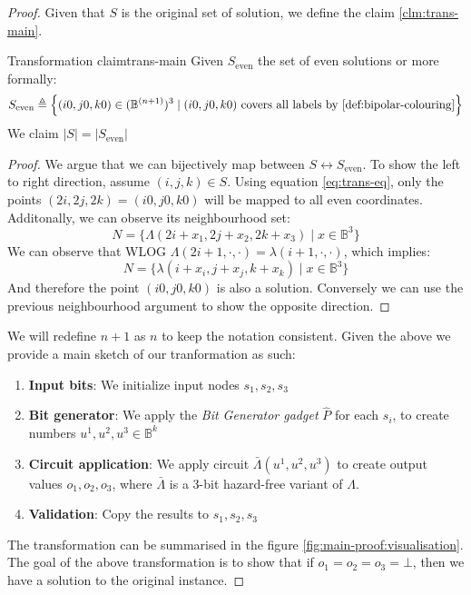 \begin{proof}
Given that $S$ is the original set of solution, we define the claim \ref{clm:trans-main}.

\begin{claimbox}{Transformation claim}{trans-main}
    \label{clm:main-proof:trans-claim}
    Given $S_{\text{even}}$ the set of even solutions or more formally:
    $$
        S_{\text{even}} \triangleq
        \Big\{(i0,j0,k0) \in (\mathbb{B}^{(n+1)})^3 \mid (i0,j0,k0) \text{ covers all labels by \ref{def:bipolar-colouring}} \Big\}
    $$
    We claim $|S| = |S_{\text{even}}|$
\end{claimbox}

\begin{proof}
    We argue that we can bijectively map between $S \leftrightarrow S_{\text{even}}$.
    To show the left to right direction, assume $(i,j,k) \in S$.
    Using equation \ref{eq:trans-eq}, only the points $(2i, 2j, 2k) = (i0, j0,k0)$ will be mapped to all even coordinates.
    Additonally, we can observe its neighbourhood set:
    $$
    N = \Big\{\Lambda(2i + x_1, 2j + x_2, 2k + x_3) \mid x \in \mathbb{B}^3 \Big\}
    $$
    We can observe that WLOG $\Lambda(2i + 1, \cdot, \cdot) = \lambda(i + 1, \cdot, \cdot)$, which implies:
    $$
    N = \Big\{\lambda(i + x_i, j + x_j, k + x_k) \mid x \in \mathbb{B}^3 \Big\}
    $$
    And therefore the point $(i0, j0,k0)$ is also a solution. Conversely we can use the previous neighbourhood argument to show the opposite
    direction.
\end{proof}
We will redefine $n + 1$ as $n$ to keep the notation consistent.
Given the above we provide a main sketch of our tranformation as such:
\begin{enumerate}
    \item \textbf{Input bits}: We initialize input nodes $s_1, s_2, s_3$
    \item \textbf{Bit generator}: We apply the \textit{Bit Generator gadget} $\hat{P}$ for each $s_i$,
        to create numbers $u^1, u^2, u^3 \in \mathbb{B}^{k}$
    \item \textbf{Circuit application}: We apply circuit $\bar{\Lambda}(u^1, u^2, u^3)$ to create output values $o_1, o_2, o_3$, where 
$\bar{\Lambda}$ is a 3-bit hazard-free variant of $\Lambda$.
    \item \textbf{Validation}: Copy the results to $s_1, s_2, s_3$
\end{enumerate}
The transformation can be summarised in the figure \ref{fig:main-proof:visualisation}.
The goal of the above transformation is to show that if $o_1 = o_2 =o_3 = \bot$, then we have a solution
to the original instance.


\end{proof}
